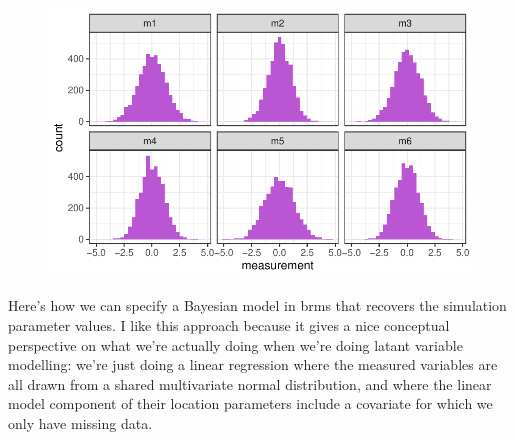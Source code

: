 \documentclass[
  letterpaper,
  DIV=11,
  numbers=noendperiod]{scrreprt}
\begin{document}
\begin{figure}[H]

{\centering \includegraphics{./bayesian-cfa_files/figure-pdf/sim-1-fac-1.pdf}

}

\end{figure}

Here's how we can specify a Bayesian model in brms that recovers the
simulation parameter values. I like this approach because it gives a
nice conceptual perspective on what we're actually doing when we're
doing latant variable modelling: we're just doing a linear regression
where the measured variables are all drawn from a shared multivariate
normal distribution, and where the linear model component of their
location parameters include a covariate for which we only have missing
data.
\end{document}
